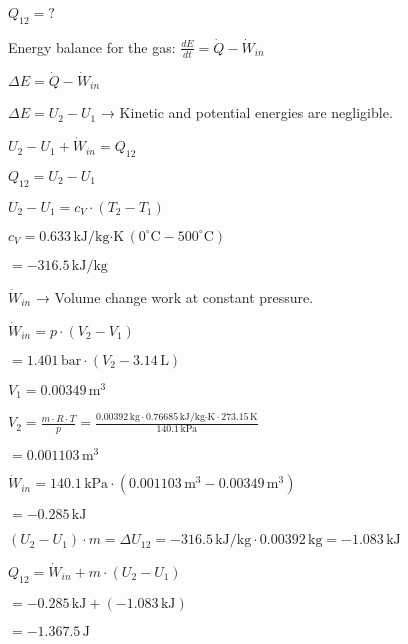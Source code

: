 \( Q_{12} = ? \)  

Energy balance for the gas:  
\( \frac{dE}{dt} = \dot{Q} - \dot{W}_{in} \)  

\( \Delta E = \dot{Q} - \dot{W}_{in} \)  

\( \Delta E = U_2 - U_1 \) → Kinetic and potential energies are negligible.  

\( U_2 - U_1 + \dot{W}_{in} = Q_{12} \)  

\( Q_{12} = U_2 - U_1 \)  

\( U_2 - U_1 = c_V \cdot (T_2 - T_1) \)  

\( c_V = 0.633 \, \text{kJ/kg·K} \, (0^\circ \text{C} - 500^\circ \text{C}) \)  

\( = -316.5 \, \text{kJ/kg} \)  

\( \dot{W}_{in} \) → Volume change work at constant pressure.  

\( \dot{W}_{in} = p \cdot (V_2 - V_1) \)  

\( = 1.401 \, \text{bar} \cdot (V_2 - 3.14 \, \text{L}) \)  

\( V_1 = 0.00349 \, \text{m}^3 \)  

\( V_2 = \frac{m \cdot R \cdot T}{p} = \frac{0.00392 \, \text{kg} \cdot 0.76685 \, \text{kJ/kg·K} \cdot 273.15 \, \text{K}}{140.1 \, \text{kPa}} \)  

\( = 0.001103 \, \text{m}^3 \)  

\( \dot{W}_{in} = 140.1 \, \text{kPa} \cdot (0.001103 \, \text{m}^3 - 0.00349 \, \text{m}^3) \)  

\( = -0.285 \, \text{kJ} \)  

\( (U_2 - U_1) \cdot m = \Delta U_{12} = -316.5 \, \text{kJ/kg} \cdot 0.00392 \, \text{kg} = -1.083 \, \text{kJ} \)  

\( Q_{12} = \dot{W}_{in} + m \cdot (U_2 - U_1) \)  

\( = -0.285 \, \text{kJ} + (-1.083 \, \text{kJ}) \)  

\( = -1.367.5 \, \text{J} \)